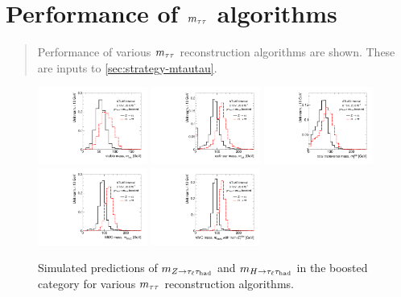 \chapter[Performance of $\mtautau$ algorithms][Performance of $\mtautau$ algorithms]{Performance of $\mtautau$ algorithms}
\label{apx:mtautau}

\begin{quote}
Performance of various $\mtautau$ reconstruction algorithms are shown. These are inputs to \cref{sec:strategy-mtautau}.
\end{quote}

\begin{figure}[tp]
  \centering
  \includegraphics[width=0.32\textwidth]{figures/mtautau/mtautau-boost-mvis}
  \includegraphics[width=0.32\textwidth]{figures/mtautau/mtautau-boost-mcol}
  \includegraphics[width=0.32\textwidth]{figures/mtautau/mtautau-boost-mttot}
  \includegraphics[width=0.32\textwidth]{figures/mtautau/mtautau-boost-mMMC}
  \includegraphics[width=0.32\textwidth]{figures/mtautau/mtautau-boost-mMMC_Truth}
  \caption{Simulated predictions of $m_{Z\rightarrow\tau_\ell\tau_\text{had}}$ and $m_{H\rightarrow\tau_\ell\tau_\text{had}}$ in the boosted category for various $\mtautau$ reconstruction algorithms.}
  \label{fig:mtautau-boost}
\end{figure}

